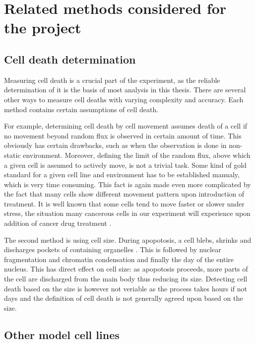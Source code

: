 \documentclass[pdftex,12pt,a4paper]{report}
\begin{document}
\section{Related methods considered for the project}

\subsection{Cell death determination}
\label{subsection:comp_cell_death_determination}

Measuring cell death is a crucial part of the experiment, as the reliable determination of it is the basis of most analysis in this thesis. There are several other ways to measure cell deaths with varying complexity and accuracy. Each method contains certain assumptions of cell death.

For example, determining cell death by cell movement assumes death of a cell if no movement beyond random flux is observed in certain amount of time. This obviously has certain drawbacks, such as when the observation is done in non-static environment. Moreover, defining the limit of the random flux, above which a given cell is assumed to actively move, is not a trivial task. Some kind of gold standard for a given cell line and environment has to be established manualy, which is very time consuming. This fact is again made even more complicated by the fact that many cells show different movement pattern upon introduction of treatment. It is well known that some cells tend to move faster or slower under stress, the situation many cancerous cells in our experiment will experience upon addition of cancer drug treatment \cite{pienta1991effects, fenteany2003small, ruocco2012suppressing}.

The second method is using cell size. During apopotosis, a cell blebs, shrinks and discharges pockets of containing organelles \cite{green2011means}. This is followed by nuclear fragmentation and chromatin condensation and finally the day of the entire nucleus. This has direct effect on cell size: as apopotosis proceeds, more parts of the cell are discharged from the main body thus reducing its size. Detecting cell death based on the size is however not veriable as the process takes hours if not days and the definition of cell death is not generally agreed upon based on the size.

\subsection{Other model cell lines}
\end{document}
